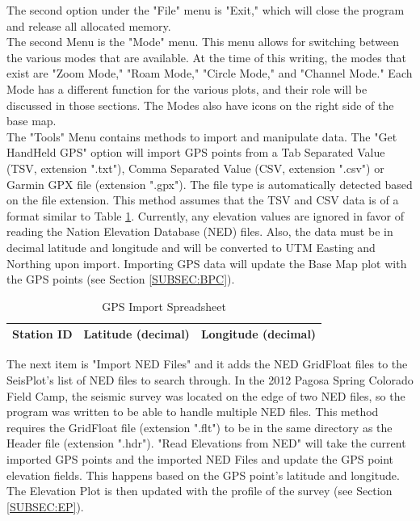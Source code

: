 \documentclass[12pt]{article}
\begin{document}
The second option under the "File" menu is "Exit," which will close the program and release all allocated memory. \\

The second Menu is the "Mode" menu. This menu allows for switching between the various modes that are available. At the time of this writing, the modes that exist are "Zoom Mode," "Roam Mode," "Circle Mode," and "Channel Mode." Each Mode has a different function for the various plots, and their role will be discussed in those sections. The Modes also have icons on the right side of the base map. \\

The "Tools" Menu contains methods to import and manipulate data. The "Get HandHeld GPS" option will import GPS points from a Tab Separated Value (TSV, extension ".txt"), Comma Separated Value (CSV, extension ".csv") or Garmin GPX file (extension ".gpx"). The file type is automatically detected based on the file extension. This method assumes that the TSV and CSV data is of a format similar to Table \ref{TAB:GPS2}. Currently, any elevation values are ignored in favor of reading the Nation Elevation Database (NED) files. Also, the data must be in decimal latitude and longitude and will be converted to UTM Easting and Northing upon import. Importing GPS data will update the Base Map plot with the GPS points (see Section \ref{SUBSEC:BPC}).\\

\begin{table}[h]
\caption{GPS Import Spreadsheet}
\centering
\begin{tabular}{ c | c | c}
  \hline                  
  Station ID & Latitude (decimal) & Longitude (decimal) \\
  \hline
\end{tabular}
\label{TAB:GPS2}
\end{table}

The next item is "Import NED Files" and it adds the NED GridFloat files to the SeisPlot's list of NED files to search through. In the 2012 Pagosa Spring Colorado Field Camp, the seismic survey was located on the edge of two NED files, so the program was written to be able to handle multiple NED files. This method requires the GridFloat file (extension ".flt") to be in the same directory as the Header file (extension ".hdr"). "Read Elevations from NED" will take the current imported GPS points and the imported NED Files and update the GPS point elevation fields. This happens based on the GPS point's latitude and longitude. The Elevation Plot is then updated with the profile of the survey (see Section \ref{SUBSEC:EP}). \\
\end{document}
